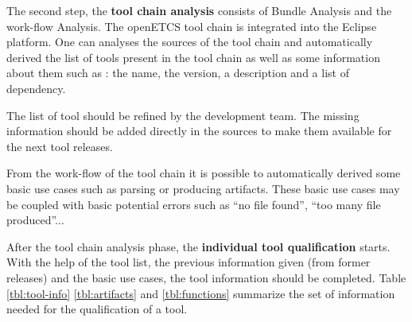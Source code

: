 


The second step, the {\bf tool chain analysis} consists of Bundle Analysis
and the work-flow Analysis.
The openETCS tool chain is integrated into the Eclipse platform. One
can analyses the sources of the tool chain and automatically derived
the list of tools present in the tool chain as well as some
information about them such as :  the name,  the version,
a description and a list of dependency.

The list of tool should be refined by the development team.
The missing information should be added directly in the
sources to make them available for the next tool releases.


From the work-flow of the tool chain it is possible to automatically
derived some basic use cases such as parsing or producing
artifacts. These basic use cases may be coupled with basic potential
errors such as ``no file found'', ``too many file produced''...

After the tool chain analysis phase, the {\bf individual tool qualification}
starts. With the help of the tool list, the previous information given
(from former releases) and the basic use cases, the tool information
should be completed. Table \ref{tbl:tool-info} \ref{tbl:artifacts} and
\ref{tbl:functions} summarize the set of information needed for the
qualification of a tool.

